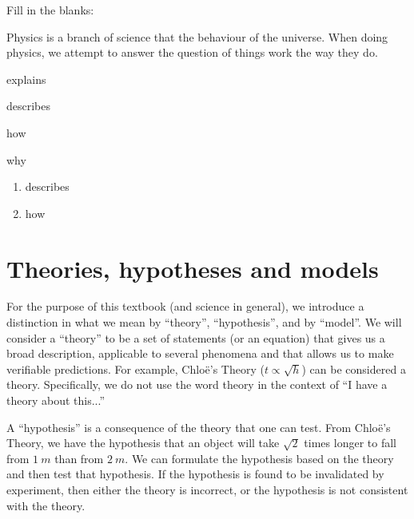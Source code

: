 \begin{checkpoint}
\begin{MCquestion}{Fill in the blanks:

Physics is a branch of science that \underline{\hspace{2cm}} the behaviour of the universe. When doing physics, we attempt to answer the question of \underline{\hspace{2cm}} things work the way they do.}
\item explains
\item describes 
\item how 
\item why
\end{MCquestion}
\begin{answer}
\begin{enumerate}
\item describes
\item how
\end{enumerate}
\end{answer}
\end{checkpoint}

\section{Theories, hypotheses and models}
For the purpose of this textbook (and science in general), we introduce a distinction in what we mean by ``theory'', ``hypothesis'', and by ``model''. We will consider a ``theory'' to be a set of statements (or an equation) that gives us a broad description, applicable to several phenomena and that allows us to make verifiable predictions. For example, Chlo\"e's Theory ($t \propto \sqrt{h}$) can be considered a theory. Specifically, we do not use the word theory in the context of ``I have a theory about this...''

A ``hypothesis'' is a consequence of the theory that one can test. From Chlo\"e's Theory, we have the hypothesis that an object will take $\sqrt{2}$ times longer to fall from $\SI{1}{m}$ than from $\SI{2}{m}$. We can formulate the hypothesis based on the theory and then test that hypothesis. If the hypothesis is found to be invalidated by experiment, then either the theory is incorrect, or the hypothesis is not consistent with the theory.

